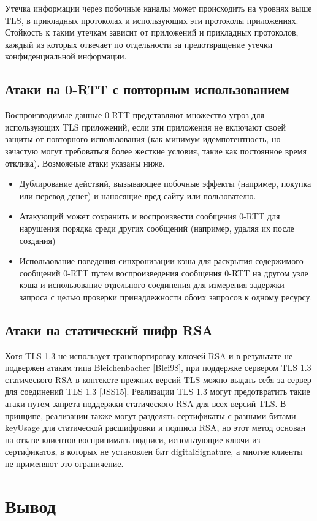     Утечка информации через побочные каналы может происходить на уровнях выше TLS, в прикладных протоколах и использующих эти протоколы приложениях. Стойкость к таким утечкам зависит от приложений и прикладных протоколов, каждый из которых отвечает по отдельности за предотвращение утечки конфиденциальной информации.
    
    \subsection{Атаки на 0-RTT с повторным использованием}
    
    Воспроизводимые данные 0-RTT представляют множество угроз для использующих TLS приложений, если эти приложения не включают своей защиты от повторного использования (как минимум идемпотентность, но зачастую могут требоваться более жесткие условия, такие как постоянное время отклика). Возможные атаки указаны ниже.
    
    \begin{itemize}
    	\item 
    	
    	Дублирование действий, вызывающее побочные эффекты (например, покупка или перевод денег) и наносящие вред сайту или пользователю.
    	
    	\item Атакующий может сохранить и воспроизвести сообщения 0-RTT для нарушения порядка среди других сообщений (например, удаляя их после создания)
    	
    	\item Использование поведения синхронизации кэша для раскрытия содержимого сообщений 0-RTT путем воспроизведения сообщения 0-RTT на другом узле кэша и использование отдельного соединения для измерения задержки запроса с целью проверки принадлежности обоих запросов к одному ресурсу.
    \end{itemize}
    
    \subsection{Атаки на статический шифр RSA}

	Хотя TLS 1.3 не использует транспортировку ключей RSA и в результате не подвержен атакам типа Bleichenbacher [Blei98], при поддержке сервером TLS 1.3 статического RSA в контексте прежних версий TLS можно выдать себя за сервер для соединений TLS 1.3 [JSS15]. Реализации TLS 1.3 могут предотвратить такие атаки путем запрета поддержки статического RSA для всех версий TLS. В принципе, реализации также могут разделять сертификаты с разными битами keyUsage для статической расшифровки и подписи RSA, но этот метод основан на отказе клиентов воспринимать подписи, использующие ключи из сертификатов, в которых не установлен бит digitalSignature, а многие клиенты не применяют это ограничение.

    \section{Вывод}

        